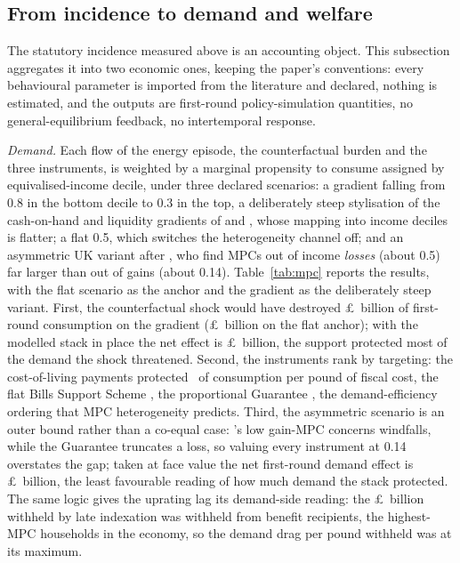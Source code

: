 \subsection{From incidence to demand and welfare}\label{sec:results-mpc}

The statutory incidence measured above is an accounting object. This
subsection aggregates it into two economic ones, keeping the paper's
conventions: every behavioural parameter is imported from the
literature and declared, nothing is estimated, and the outputs are
first-round policy-simulation quantities, no general-equilibrium
feedback, no intertemporal response.

\emph{Demand.} Each flow of the energy episode, the counterfactual
burden and the three instruments, is weighted by a marginal
propensity to consume assigned by equivalised-income decile, under
three declared scenarios: a gradient falling from 0.8 in the bottom
decile to 0.3 in the top, a deliberately steep stylisation of the
cash-on-hand and liquidity gradients of \citet{jappelli2014} and
\citet{fagereng2021}, whose mapping into income deciles is flatter; a flat 0.5, which
switches the heterogeneity channel off; and an asymmetric UK variant
after \citet{bunn2018}, who find MPCs out of income \emph{losses}
(about 0.5) far larger than out of gains (about 0.14).
Table~\ref{tab:mpc} reports the results, with the flat scenario as
the anchor and the gradient as the deliberately steep variant. First,
the counterfactual shock would have destroyed
\pounds\SsMpcBurdenGradientBn\ billion of first-round consumption on
the gradient (\pounds\SsMpcBurdenFlatBn\ billion on the flat anchor);
with the modelled stack in place the net effect is
\pounds\SsMpcNetGradientBn\ billion, the support protected most of
the demand the shock threatened. Second, the instruments rank by
targeting: the cost-of-living payments protected
\SsMpcColPerPound\ of consumption per pound of fiscal cost, the flat
Bills Support Scheme \SsMpcEbssPerPound, the proportional Guarantee
\SsMpcEpgPerPound, the demand-efficiency ordering that MPC
heterogeneity predicts. Third, the asymmetric scenario is an outer bound rather than a
co-equal case: \citet{bunn2018}'s low gain-MPC concerns windfalls,
while the Guarantee truncates a loss, so valuing every instrument at
0.14 overstates the gap; taken at face value the net first-round
demand effect is \pounds\SsMpcNetAsymBn\ billion, the least
favourable reading of how much demand the stack protected. The same logic gives the uprating lag its
demand-side reading: the \pounds\SsVinLagCostBn\ billion withheld
by late indexation was withheld from benefit recipients, the
highest-MPC households in the economy, so the demand drag per pound
withheld was at its maximum.


